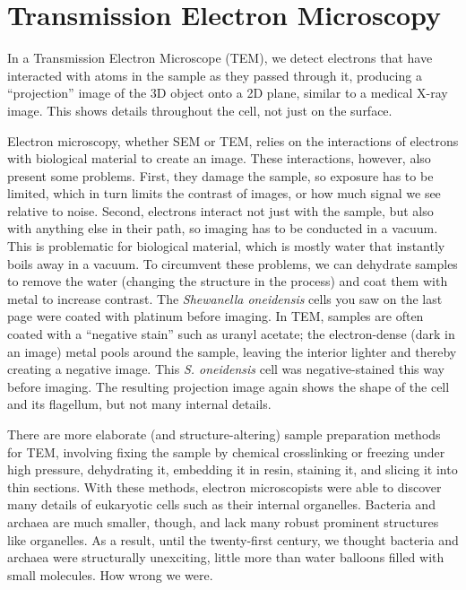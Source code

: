 \documentclass[]{tufte-book}
\begin{document}
\section{Transmission Electron
Microscopy}\label{transmission-electron-microscopy}

In a Transmission Electron Microscope (TEM), we detect electrons that
have interacted with atoms in the sample as they passed through it,
producing a ``projection'' image of the 3D object onto a 2D plane,
similar to a medical X-ray image. This shows details throughout the
cell, not just on the surface.

Electron microscopy, whether SEM or TEM, relies on the interactions of
electrons with biological material to create an image. These
interactions, however, also present some problems. First, they damage
the sample, so exposure has to be limited, which in turn limits the
contrast of images, or how much signal we see relative to noise. Second,
electrons interact not just with the sample, but also with anything else
in their path, so imaging has to be conducted in a vacuum. This is
problematic for biological material, which is mostly water that
instantly boils away in a vacuum. To circumvent these problems, we can
dehydrate samples to remove the water (changing the structure in the
process) and coat them with metal to increase contrast. The
\emph{Shewanella oneidensis} cells you saw on the last page were coated
with platinum before imaging. In TEM, samples are often coated with a
``negative stain'' such as uranyl acetate; the electron-dense (dark in
an image) metal pools around the sample, leaving the interior lighter
and thereby creating a negative image. This \emph{S. oneidensis} cell
was negative-stained this way before imaging. The resulting projection
image again shows the shape of the cell and its flagellum, but not many
internal details.

There are more elaborate (and structure-altering) sample preparation
methods for TEM, involving fixing the sample by chemical crosslinking or
freezing under high pressure, dehydrating it, embedding it in resin,
staining it, and slicing it into thin sections. With these methods,
electron microscopists were able to discover many details of eukaryotic
cells such as their internal organelles. Bacteria and archaea are much
smaller, though, and lack many robust prominent structures like
organelles. As a result, until the twenty-first century, we thought
bacteria and archaea were structurally unexciting, little more than
water balloons filled with small molecules. How wrong we were.
\end{document}
